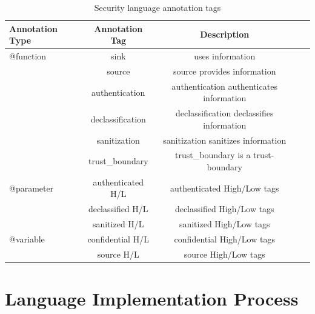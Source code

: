 \begin{table}
\begin{tabular}{l*{3}{c}r}
	\hline
	Annotation Type   & Annotation Tag & Description  \\
	\hline
	@function         & sink  		   & uses information \\
	                  & source         & source provides information	\\
	                  & authentication & authentication authenticates information	\\
	                  & declassification& declassification declassifies information	\\
	                  & sanitization   & sanitization sanitizes information	\\
	                  & trust\_boundary& trust\_boundary is a trust-boundary\\ \hline

	@parameter        & authenticated H/L & authenticated High/Low tags    \\
					  & declassified H/L  & declassified High/Low tags    \\
				      & sanitized H/L     & sanitized High/Low tags    \\ \hline
	@variable         & confidential H/L & confidential High/Low tags\\
					  & source H/L & source High/Low tags   \\
	\hline
	
\end{tabular}
\caption{Security language annotation tags}
\label{table:Security_language_annotation_tags}
\end{table}

\section{Language Implementation Process}

